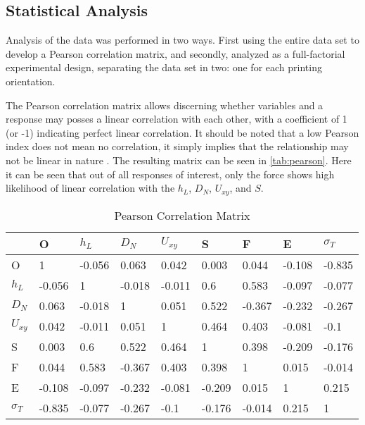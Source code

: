 \documentclass[main.tex]{subfiles}
\begin{document}

\subsection{Statistical Analysis}\label{ssec:fact}
Analysis of the data was performed in two ways. First using the entire data set to develop a Pearson correlation matrix, and secondly, analyzed as a full-factorial experimental design, separating the data set in  two: one for each printing orientation. 

The Pearson correlation matrix allows discerning whether variables and a response may posses a linear correlation with each other, with a coefficient of 1 (or -1) indicating perfect linear correlation. It should be noted that a low Pearson index does not mean no correlation, it simply implies that the relationship may not be linear in nature \cite{Geron2019}. The resulting matrix can be seen in \ref{tab:pearson}. Here it can be seen that out of all responses of interest, only the force shows high likelihood of linear correlation with the $h_{L}$, $D_{N}$, $U_{xy}$, and $S$.

\begin{table}[!htbp]
	\renewcommand{\arraystretch}{1.5}
	\centering
	\caption{Pearson Correlation Matrix}
	\begin{tabular}{l|llllllll}
		\toprule
		& O      & $h_{L}$     & $D_N$  & $U_{xy}$     & S      & F      & E      & $\sigma_{T}$ \\
		\midrule
		O            & 1      & -0.056 & 0.063  & 0.042  & 0.003  & 0.044  & -0.108 & -0.835       \\
		$h_{L}$           & -0.056 & 1      & -0.018 & -0.011 & 0.6    & 0.583  & -0.097 & -0.077       \\
		$D_N$        & 0.063  & -0.018 & 1      & 0.051  & 0.522  & -0.367 & -0.232 & -0.267       \\
		$U_{xy}$           & 0.042  & -0.011 & 0.051  & 1      & 0.464  & 0.403  & -0.081 & -0.1         \\
		S            & 0.003  & 0.6    & 0.522  & 0.464  & 1      & 0.398  & -0.209 & -0.176       \\
		F            & 0.044  & 0.583  & -0.367 & 0.403  & 0.398  & 1      & 0.015  & -0.014       \\
		E            & -0.108 & -0.097 & -0.232 & -0.081 & -0.209 & 0.015  & 1      & 0.215        \\
		$\sigma_{T}$ & -0.835 & -0.077 & -0.267 & -0.1   & -0.176 & -0.014 & 0.215  & 1\\
		\bottomrule          
	\end{tabular}
\end{table} \label{tab:pearson}
\end{document}
